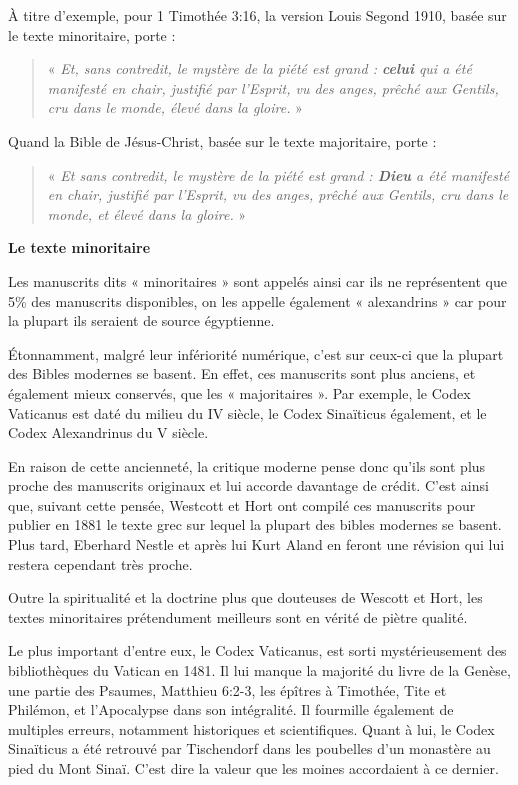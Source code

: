 \begin{small}
À titre d'exemple, pour 1 Timothée 3:16, la version Louis Segond 1910, basée sur le texte minoritaire, porte :
\begin{quote}
« \emph{Et, sans contredit, le mystère de la piété est grand : \textbf{celui} qui a été manifesté en chair, justifié par l'Esprit, vu des anges, prêché aux Gentils, cru dans le monde, élevé dans la gloire.} »
\end{quote}

Quand la Bible de Jésus-Christ, basée sur le texte majoritaire, porte :
\begin{quote}
« \emph{Et sans contredit, le mystère de la piété est grand : \textbf{Dieu} a été manifesté en chair, justifié par l'Esprit, vu des anges, prêché aux Gentils, cru dans le monde, et élevé dans la gloire.} »\newline
\end{quote}

\textbf{Le texte minoritaire}\bigskip

Les manuscrits dits « minoritaires » sont appelés ainsi car ils ne représentent que 5\% des manuscrits disponibles, on les appelle également « alexandrins » car pour la plupart ils seraient de source égyptienne.\bigskip

Étonnamment, malgré leur infériorité numérique, c'est sur ceux-ci que la plupart des Bibles modernes se basent. En effet, ces manuscrits sont plus anciens, et également mieux conservés, que les « majoritaires ». Par exemple, le Codex Vaticanus est daté du milieu du IV siècle, le Codex Sinaïticus également, et le Codex Alexandrinus du V siècle.\bigskip

En raison de cette ancienneté, la critique moderne pense donc qu'ils sont plus proche des manuscrits originaux et lui accorde davantage de crédit. C'est ainsi que, suivant cette pensée, Westcott et Hort ont compilé ces manuscrits pour publier en 1881 le texte grec sur lequel la plupart des bibles modernes se basent. Plus tard, Eberhard Nestle et après lui Kurt Aland en feront une révision qui lui restera cependant très proche.\bigskip

Outre la spiritualité et la doctrine plus que douteuses de Wescott et Hort, les textes minoritaires prétendument meilleurs sont en vérité de piètre qualité.\bigskip

Le plus important d'entre eux, le Codex Vaticanus, est sorti mystérieusement des bibliothèques du Vatican en 1481. Il lui manque la majorité du livre de la Genèse, une partie des Psaumes, Matthieu 6:2-3, les épîtres à Timothée, Tite et Philémon, et l'Apocalypse dans son intégralité. Il fourmille également de multiples erreurs, notamment historiques et scientifiques. Quant à lui, le Codex Sinaïticus a été retrouvé par Tischendorf dans les poubelles d'un monastère au pied du Mont Sinaï. C'est dire la valeur que les moines accordaient à ce dernier.\bigskip


\end{small}
